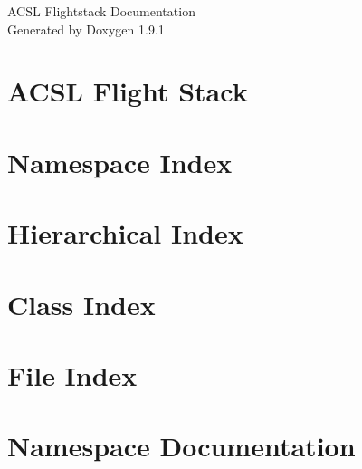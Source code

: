 \let\mypdfximage\pdfximage\def\pdfximage{\immediate\mypdfximage}\documentclass[twoside]{book}
\newcommand{\+}{\discretionary{\mbox{\scriptsize$\hookleftarrow$}}{}{}}
\newcommand{\clearemptydoublepage}{%
  \newpage{\pagestyle{empty}\cleardoublepage}%
}
\begin{document}
\raggedbottom

\hypersetup{pageanchor=false,
             bookmarksnumbered=true,
             pdfencoding=unicode
            }
\begin{titlepage}
\vspace*{7cm}
\begin{center}%
{\Large ACSL Flightstack Documentation }\\
\vspace*{1cm}
{\large Generated by Doxygen 1.9.1}\\
\end{center}
\end{titlepage}
\clearemptydoublepage
{}
\tableofcontents
\clearemptydoublepage
{}
\hypersetup{pageanchor=true}

\chapter{ACSL Flight Stack}
\label{index}\hypertarget{index}{}
\chapter{Namespace Index}

\chapter{Hierarchical Index}

\chapter{Class Index}

\chapter{File Index}

\chapter{Namespace Documentation}








\end{document}
